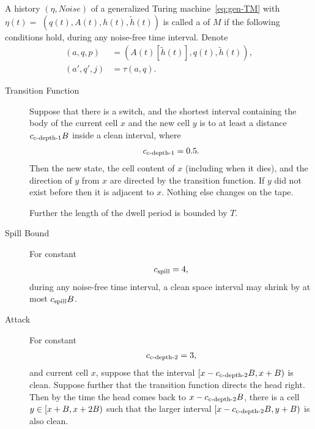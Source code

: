 \documentclass[12pt]{memoir}
\def\B{B}
\newcommand{\h}{h}
\newcommand{\hc}{\tilde h}
\newcommand{\Noise}{\mathit{Noise}}
\newcommand{\Tu}{T}
\newcommand{\cns}[1]{c_{\textrm{\upshape #1}}}
\newcommand{\cCDepth}[1]{\cns{c-depth-#1}}
\newcommand{\cSpill}{\cns{spill}}
\begin{document}
\begin{definition}[Trajectory]\label{def:traj}
\begin{sloppypar}
   A history  \( (\eta, \Noise) \) of a generalized Turing 
machine~\eqref{eq:gen-TM} with \(\eta(t) =\)
\( (q(t), A(t), \h(t), \hc(t)) \)
is called a  of \( M \) if the following conditions hold, during any 
noise-free time interval.
Denote 
\begin{align*}
     (a, q, p) &= (A(t)[\hc(t)], q(t),\hc(t)),
\\ (a',q',j)   &= \tau(a,q).
 \end{align*}
  \end{sloppypar}
\begin{description}

\item[Transition Function]\label{i:def.traj.transition}
Suppose that there is a switch, and the shortest interval
containing the body of the current cell \( x \) and the
new cell \( y \) is to at least a distance \( \cCDepth1 \B \) inside
a clean interval, where
 \begin{align}\label{eq:cns.clean-depth-1}
  \cCDepth1 =0.5.
 \end{align}
Then the new state, the cell content of \( x \) (including when it dies), and
the direction of \( y \) from \( x \) are directed by the transition function.
If \( y \) did not exist before then it is adjacent to \( x \).
Nothing else changes on the tape.

Further the length of the dwell period is bounded by \( \Tu \).


\item[Spill Bound]\label{i:spill-bound}
For constant
\begin{align}\label{eq:cns.spill}
   \cSpill =4,
 \end{align}
during any noise-free time interval, 
a clean space interval may shrink by at most \( \cSpill \B \).

\item[Attack] \label{i:def.traj.attack-from-outside}
For constant
\begin{align}\label{eq:cns.clean-depth-2}
   \cCDepth2 =3,
 \end{align}
and current cell \( x \), suppose that the interval
\( \lint{x-\cCDepth2\B}{x+\B} \) is clean.
Suppose further that the transition function directs the head right.
Then by the time the head comes back to \( x-\cCDepth2 \B \), there is a cell
\( y\in \lint{x+\B}{x+2\B} \) such that the larger interval 
\( \lint{x-\cCDepth2\B}{y+\B} \) is also clean.


\end{description}
\end{definition}
\end{document}
